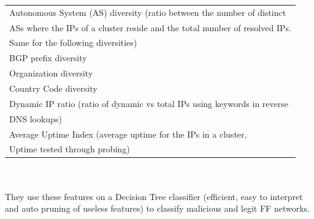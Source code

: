 \begin{tabular}{|l|}
\hline
Autonomous System (AS) diversity (ratio between the number of distinct\\ ASs where the IPs of a cluster reside and the total number of resolved IPs. \\Same for the following diversities)\\
\hline
BGP prefix diversity\\
\hline
Organization diversity\\
\hline
Country Code diversity\\
\hline
Dynamic IP ratio (ratio of dynamic vs total IPs using keywords in reverse\\ DNS lookups)\\
\hline
Average Uptime Index (average uptime for the IPs in a cluster,\\ Uptime tested through probing)\\
\hline
\end{tabular}
\\\\
They use these features on a Decision Tree classifier (efficient, easy to interpret and auto pruning of useless features) to classify malicious and legit FF networks.\\

